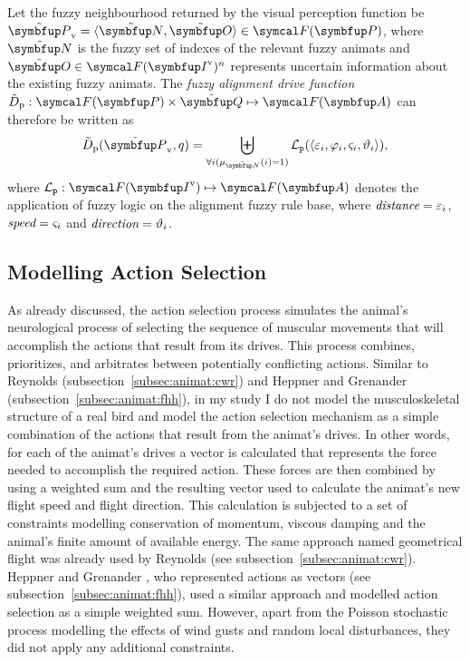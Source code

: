 \begin{definition}
	\label{def:fuzzyAnimat:Dp:afd} 
	Let the fuzzy neighbourhood returned by the visual perception function be $\fset{P}_\textnormal{v}=\langle \fset{N}, \fset{O} \rangle \in \fpowset{\set{P}}$, where $\fset{N}$ is the fuzzy set of indexes of the relevant fuzzy animats and $\fset{O} \in \fpowset{\set{I}^\textnormal{v}}^n$ represents uncertain information about the existing fuzzy animats. The \emph{fuzzy alignment drive function} $\ffunc{D}_\textnormal{p}: \fpowset{\set{P}} \times \fset{Q} \mapsto \fpowset{\set{A}}$ can therefore be written as
	\begin{equation}
		\ffunc{D}_\textnormal{p}(\fset{P}_\textnormal{v},q)=%
		 \biguplus_{\forall i(\mu_\fset{N}(i)=1)} \mathcal{L}_\texttt{p}(\langle \varepsilon_i, \varphi_i, \varsigma_i, \vartheta_i \rangle),
	\end{equation}
	where $\mathcal{L}_\texttt{p}: \fpowset{\set{I}^\textnormal{v}} \mapsto \fpowset{\set{A}}$ denotes the application of fuzzy logic on the alignment fuzzy rule base, where $\emph{distance}=\varepsilon_i$, $\emph{speed}=\varsigma_i$ and $\emph{direction}=\vartheta_i$.
\end{definition}

\subsection{Modelling Action Selection}
As already discussed, the action selection process simulates the animal's neurological process of selecting the sequence of muscular movements that will accomplish the actions that result from its drives. This process combines, prioritizes, and arbitrates between potentially conflicting actions. Similar to Reynolds \cite{reynolds:1987,reynolds:1999} (subsection~\ref{subsec:animat:cwr}) and Heppner and Grenander \cite{heppner:1990} (subsection~\ref{subsec:animat:fhh}), in my study I do not model the musculoskeletal structure of a real bird and model the action selection mechanism as a simple combination of the actions that result from the animat's drives. In other words, for each of the animat's drives a vector is calculated that represents the force needed to accomplish the required action. These forces are then combined by using a weighted sum and the resulting vector used to calculate the animat's new flight speed and flight direction. This calculation is subjected to a set of constraints modelling conservation of momentum, viscous damping and the animal's finite amount of available energy. The same approach named geometrical flight was already used by Reynolds \cite{reynolds:1987,reynolds:1999} (see subsection~\ref{subsec:animat:cwr}). Heppner and Grenander \cite{heppner:1990}, who represented actions as vectors (see subsection~\ref{subsec:animat:fhh}), used a similar approach and modelled action selection as a simple weighted sum. However, apart from the Poisson stochastic process modelling the effects of wind gusts and random local disturbances, they did not apply any additional constraints. 

